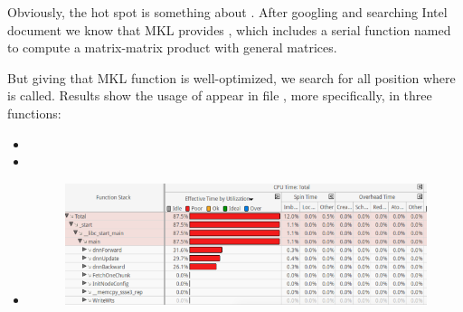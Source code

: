 \documentclass{article}
\begin{document}
Obviously, the hot spot is something about . After googling
and searching Intel document we know that MKL provides , which includes a serial function named 
to compute a matrix-matrix product with general matrices.%

But giving that MKL function is well-optimized, we search for all position where  is called. Results show the usage of  appear in file , more specifically, in three functions:%

\begin{itemize}[noitemsep,topsep=\mdcompacttopsep]%

\item{}%

\item{}%

\item{}

\begin{figure}[tbp]%
\begin{mdcenter}%

\noindent{}\includegraphics[keepaspectratio=true,width=\dimmin{}{\dimwidth{0.90}}]{images/2016-02-19-10-36-25-}{}%

\mdhr{}%

\noindent{}%
\end{mdcenter}\label{fig-myfigure}%
\end{figure}%
\end{itemize}%
\end{document}
